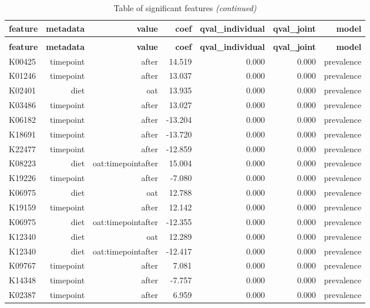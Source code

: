 \documentclass[
]{article}
\begin{document}
\begin{longtable}[t]{lrrrrrr}
\caption{Table of significant features}\\
\toprule
\textbf{feature} & \textbf{metadata} & \textbf{value} & \textbf{coef} & \textbf{qval\_individual} & \textbf{qval\_joint} & \textbf{model}\\
\midrule
\endfirsthead
\caption[]{Table of significant features \textit{(continued)}}\\
\toprule
\textbf{feature} & \textbf{metadata} & \textbf{value} & \textbf{coef} & \textbf{qval\_individual} & \textbf{qval\_joint} & \textbf{model}\\
\midrule
\endhead

\endfoot
\bottomrule
\endlastfoot
K00425 & timepoint & after & 14.519 & 0.000 & 0.000 & prevalence\\
K01246 & timepoint & after & 13.037 & 0.000 & 0.000 & prevalence\\
K02401 & diet & oat & 13.935 & 0.000 & 0.000 & prevalence\\
K03486 & timepoint & after & 13.027 & 0.000 & 0.000 & prevalence\\
K06182 & timepoint & after & -13.204 & 0.000 & 0.000 & prevalence\\
\addlinespace
K18691 & timepoint & after & -13.720 & 0.000 & 0.000 & prevalence\\
K22477 & timepoint & after & -12.859 & 0.000 & 0.000 & prevalence\\
K08223 & diet & oat:timepointafter & 15.004 & 0.000 & 0.000 & prevalence\\
K19226 & timepoint & after & -7.080 & 0.000 & 0.000 & prevalence\\
K06975 & diet & oat & 12.788 & 0.000 & 0.000 & prevalence\\
\addlinespace
K19159 & timepoint & after & 12.142 & 0.000 & 0.000 & prevalence\\
K06975 & diet & oat:timepointafter & -12.355 & 0.000 & 0.000 & prevalence\\
K12340 & diet & oat & 12.289 & 0.000 & 0.000 & prevalence\\
K12340 & diet & oat:timepointafter & -12.417 & 0.000 & 0.000 & prevalence\\
K09767 & timepoint & after & 7.081 & 0.000 & 0.000 & prevalence\\
\addlinespace
K14348 & timepoint & after & -7.757 & 0.000 & 0.000 & prevalence\\
K02387 & timepoint & after & 6.959 & 0.000 & 0.000 & prevalence\\

\end{longtable}
\end{document}
